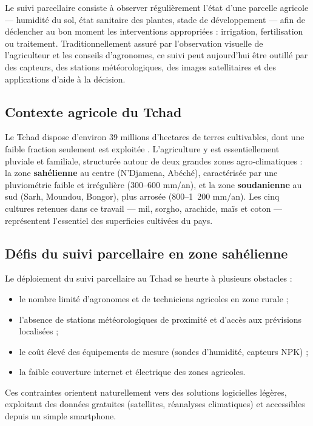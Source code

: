 Le suivi parcellaire consiste à observer régulièrement l'état
d'une parcelle agricole --- humidité du sol, état sanitaire des
plantes, stade de développement --- afin de déclencher au bon
moment les interventions appropriées : irrigation, fertilisation
ou traitement. Traditionnellement assuré par l'observation
visuelle de l'agriculteur et les conseils d'agronomes, ce suivi
peut aujourd'hui être outillé par des capteurs, des stations
météorologiques, des images satellitaires et des applications
d'aide à la décision.

\subsection{Contexte agricole du Tchad}

Le Tchad dispose d'environ 39 millions d'hectares de terres
cultivables, dont une faible fraction seulement est exploitée
\cite{banquemondiale2023}. L'agriculture y est essentiellement
pluviale et familiale, structurée autour de deux grandes zones
agro-climatiques : la zone \textbf{sahélienne} au centre
(N'Djamena, Abéché), caractérisée par une pluviométrie faible et
irrégulière (300--600 mm/an), et la zone \textbf{soudanienne} au
sud (Sarh, Moundou, Bongor), plus arrosée (800--1~200 mm/an).
Les cinq cultures retenues dans ce travail --- mil, sorgho,
arachide, maïs et coton --- représentent l'essentiel des
superficies cultivées du pays.

\subsection{Défis du suivi parcellaire en zone sahélienne}

Le déploiement du suivi parcellaire au Tchad se heurte à
plusieurs obstacles :

\begin{itemize}[leftmargin=1.2cm]
	\item le nombre limité d'agronomes et de techniciens agricoles
	en zone rurale ;
	\item l'absence de stations météorologiques de proximité et
	d'accès aux prévisions localisées ;
	\item le coût élevé des équipements de mesure (sondes
	d'humidité, capteurs NPK) ;
	\item la faible couverture internet et électrique des zones
	agricoles.
\end{itemize}

Ces contraintes orientent naturellement vers des solutions
logicielles légères, exploitant des données gratuites
(satellites, réanalyses climatiques) et accessibles depuis un
simple smartphone.

